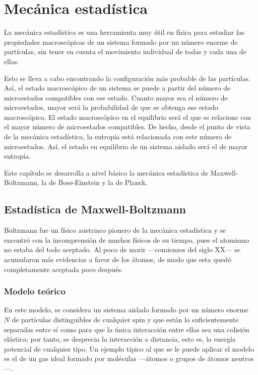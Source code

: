 %

\chapter{Mecánica estadística}
La mecánica estadística es una herramienta muy útil en física para estudiar
las propiedades macroscópicas de un sistema formado por un número enorme de
partículas, sin tener en cuenta el movimiento individual de todas y cada una de
ellas.

Esto se lleva a cabo encontrando la configuración más probable de las
partículas. Así, el estado macroscópico de un sistema se puede a partir del
número de microestados compatibles con ese estado.
Cuanto mayor sea el número de microestados, mayor será la probabilidad de que
se obtenga ese estado macroscópico. El estado macroscópico en el equilibrio
será el que se relacione con el mayor número de microestados compatibles.
De hecho, desde el punto de vista de la mecánica estadística, la entropía está
relacionada con este número de microestados. Así, el estado en equilibrio de un
sistema aislado será el de mayor entropía.

Este capítulo se desarrolla a nivel básico la mecánica estadística
de Maxwell-Boltzmann, la de Bose-Einstein y la de Planck.

\section{Estadística de Maxwell-Boltzmann}
Boltzmann fue un físico austriaco pionero de la mecánica estadística y se
encontró con la incomprensión de muchos físicos de su tiempo, pues el
atomismo no estaba del todo aceptado. Al poco de morir ---comienzos del siglo
XX--- se acumularon más evidencias a favor de los átomos, de modo que esta
quedó completamente aceptada poco después.

\subsection{Modelo teórico}
En este modelo, se considera un sistema aislado formado por un número enorme
$N$ de partículas distinguibles de cualquier spin y que están lo
suficientemente separadas entre sí como para que la única interacción entre
ellas sea una colisión elástica; por tanto, se desprecia la interacción a
distancia, esto es, la energía potencial de cualquier tipo.
Un ejemplo típico al que se le puede aplicar el modelo es el de un gas ideal
formado por moléculas ---átomos o grupos de átomos neutros---.

